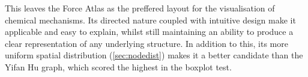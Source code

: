 This leaves the Force Atlas as the preffered layout for the visualisation of chemical mechanisms. Its directed nature coupled with intuitive design make it applicable and easy to explain, whilst still maintaining an ability to produce a clear representation of any underlying structure. In addition to this, its more uniform spatial distribution (\autoref{sec:nodedist}) makes it a better candidate than the Yifan Hu graph, which scored the highest in the boxplot test. 










